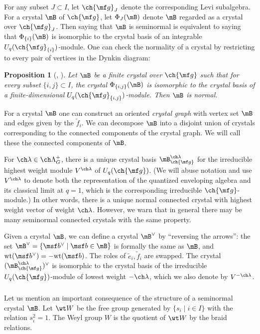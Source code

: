 \documentclass[final]{amsart}
\newtheorem{prop}[subsubsection]{Proposition}
\theoremstyle{remark}
\theoremstyle{definition}
\numberwithin{equation}{section}
\begin{document}
For any subset $J\subset I$, let $\ch{\mf g}_J$ denote the corresponding Levi subalgebra. 
For a crystal $\mB$ of $\ch{\mf g}$, let $\Phi_J(\mB)$ denote $\mB$ regarded as a crystal 
over $\ch{\mf g}_J$. 
Then saying that $\mB$ is seminormal is equivalent to saying that 
$\Phi_{\{i\}}(\mB)$ is isomorphic to the crystal basis of an integrable 
$U_q(\ch{\mf g}_{\{i\}})$-module. 
One can check the normality of a crystal by restricting to every pair
of vertices in the Dynkin diagram:

\begin{prop}[{\cite[Proposition 2.4.4]{KKMMNN}, \cite[Theorem 5.21]{BS}}] 
\label{prop:normal2}
Let $\mB$ be a finite crystal over $\ch{\mf g}$ such that for every 
subset $\{i,j\} \subset I$, the crystal $\Phi_{\{i,j\}}(\mB)$ is isomorphic to the
crystal basis of a finite-dimensional $U_q(\ch{\mf g}_{\{i,j\}})$-module. 
Then $\mB$ is normal. 
\end{prop}


For a crystal $\mB$ one can construct an oriented \emph{crystal graph} with vertex set $\mB$ and 
edges given by the $\tilde f_i$. We can decompose $\mB$ into a disjoint union 
of crystals corresponding to the connected components of the crystal graph. We will 
call these the connected components of $\mB$.


For $\ch\lambda \in \ch\Lambda^+_G$, there is a unique crystal basis 
$\mB^{\ch\lambda}_{\ch{\mf g}}$ for the irreducible highest weight module $V^{\ch\lambda}$
of $U_q(\ch{\mf g})$. (We will abuse notation and use $V^{\ch\lambda}$ to denote 
both the representation of the quantized enveloping algebra and its classical limit at
$q=1$, which is the corresponding irreducible $\ch{\mf g}$-module.)
In other words, there is a unique normal connected crystal with highest weight vector of weight 
$\ch\lambda$. However, we warn that in general there may be many seminormal connected crystals
with the same property.

Given a crystal $\mB$, we can define a crystal $\mB^\vee$ by ``reversing the arrows'':
the set $\mB^\vee = \{ \msf b^\vee \mid \msf b \in \mB\}$ is formally the same as $\mB$, and 
$\mathrm{wt}(\msf b^\vee) = -\mathrm{wt}(\msf b)$. The roles of $\tilde e_i,\tilde f_i$ 
are swapped. 
The crystal $(\mB^{\ch\lambda}_{\ch{\mf g}})^\vee$ is isomorphic to the crystal 
basis of the irreducible $U_q(\ch{\mf g})$-module of lowest weight $-\ch\lambda$, which
we also denote by $V^{-\ch\lambda}$.


\subsubsection{} \label{sect:crysW}
Let us mention an important consequence of the structure of a seminormal crystal $\mB$.
Let $\wt W$ be the free group generated by $\{ s_i \mid i \in I \}$ with
the relation $s_i^2= 1$. 
The Weyl group $W$ is the quotient of $\wt W$ by the braid
relations. 
\end{document}
